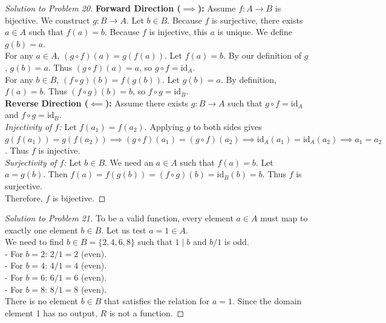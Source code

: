 \documentclass[11pt, letterpaper]{article}
\theoremstyle{definition}
\theoremstyle{remark}
\begin{document}
\begin{proof}[Solution to Problem 20]
\textbf{Forward Direction ($\implies$):} Assume $f : A \to B$ is bijective. We construct $g : B \to A$. Let $b \in B$. Because $f$ is surjective, there exists $a \in A$ such that $f(a) = b$. Because $f$ is injective, this $a$ is unique. We define $g(b) = a$. \\
For any $a \in A$, $(g \circ f)(a) = g(f(a))$. Let $f(a) = b$. By our definition of $g$, $g(b) = a$. Thus $(g \circ f)(a) = a$, so $g \circ f = \text{id}_A$. \\
For any $b \in B$, $(f \circ g)(b) = f(g(b))$. Let $g(b) = a$. By definition, $f(a) = b$. Thus $(f \circ g)(b) = b$, so $f \circ g = \text{id}_B$. \\
\textbf{Reverse Direction ($\impliedby$):} Assume there exists $g : B \to A$ such that $g \circ f = \text{id}_A$ and $f \circ g = \text{id}_B$. \\
\textit{Injectivity of $f$:} Let $f(a_1) = f(a_2)$. Applying $g$ to both sides gives $g(f(a_1)) = g(f(a_2)) \implies (g \circ f)(a_1) = (g \circ f)(a_2) \implies \text{id}_A(a_1) = \text{id}_A(a_2) \implies a_1 = a_2$. Thus $f$ is injective. \\
\textit{Surjectivity of $f$:} Let $b \in B$. We need an $a \in A$ such that $f(a) = b$. Let $a = g(b)$. Then $f(a) = f(g(b)) = (f \circ g)(b) = \text{id}_B(b) = b$. Thus $f$ is surjective. \\
Therefore, $f$ is bijective.
\end{proof}

\begin{proof}[Solution to Problem 21]
To be a valid function, every element $a \in A$ must map to exactly one element $b \in B$. Let us test $a = 1 \in A$. \\
We need to find $b \in B = \{2, 4, 6, 8\}$ such that $1 \mid b$ and $b/1$ is odd. \\
- For $b = 2$: $2/1 = 2$ (even). \\
- For $b = 4$: $4/1 = 4$ (even). \\
- For $b = 6$: $6/1 = 6$ (even). \\
- For $b = 8$: $8/1 = 8$ (even). \\
There is no element $b \in B$ that satisfies the relation for $a = 1$. Since the domain element 1 has no output, $R$ is not a function.
\end{proof}
\end{document}
